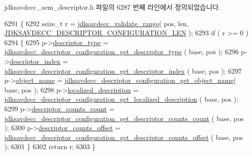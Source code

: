 jdksavdecc\+\_\+aem\+\_\+descriptor.\+h 파일의 6287 번째 라인에서 정의되었습니다.


\begin{DoxyCode}
6291 \{
6292     ssize\_t r = \hyperlink{group__util_ga9c02bdfe76c69163647c3196db7a73a1}{jdksavdecc\_validate\_range}( pos, len, 
      \hyperlink{group__descriptor__configuration_ga78260215d98013c8862d07707d8e1a85}{JDKSAVDECC\_DESCRIPTOR\_CONFIGURATION\_LEN} );
6293     \textcolor{keywordflow}{if} ( r >= 0 )
6294     \{
6295         p->\hyperlink{structjdksavdecc__descriptor__configuration_ab7c32b6c7131c13d4ea3b7ee2f09b78d}{descriptor\_type} = 
      \hyperlink{group__descriptor__configuration_ga6d8fc7c6f91ce938afbebc9681561e7f}{jdksavdecc\_descriptor\_configuration\_get\_descriptor\_type}
      ( base, pos );
6296         p->\hyperlink{structjdksavdecc__descriptor__configuration_a042bbc76d835b82d27c1932431ee38d4}{descriptor\_index} = 
      \hyperlink{group__descriptor__configuration_ga25a1868246dd5a8f9e0a6c0dd6e40526}{jdksavdecc\_descriptor\_configuration\_get\_descriptor\_index}
      ( base, pos );
6297         p->\hyperlink{structjdksavdecc__descriptor__configuration_a7d1f5945a13863b1762fc6db74fa8f80}{object\_name} = 
      \hyperlink{group__descriptor__configuration_gab176c933b7ba3d33bb57e1769e1df4c6}{jdksavdecc\_descriptor\_configuration\_get\_object\_name}( 
      base, pos );
6298         p->\hyperlink{structjdksavdecc__descriptor__configuration_a0926f846ca65a83ad5bb06b4aff8f408}{localized\_description} = 
      \hyperlink{group__descriptor__configuration_ga70dadf1368b9c22e913d1b9068a23984}{jdksavdecc\_descriptor\_configuration\_get\_localized\_description}
      ( base, pos );
6299         p->\hyperlink{structjdksavdecc__descriptor__configuration_aecc8a2d99e1f750676ee92f68ddd1fa6}{descriptor\_counts\_count} = 
      \hyperlink{group__descriptor__configuration_gad6922158e53499489216fe5842103f98}{jdksavdecc\_descriptor\_configuration\_get\_descriptor\_counts\_count}
      ( base, pos );
6300         p->\hyperlink{structjdksavdecc__descriptor__configuration_ae57b83bb9db0fb81735dba7d02bac8bb}{descriptor\_counts\_offset} = 
      \hyperlink{group__descriptor__configuration_gaa8e16a0d5ab45bd75106b222966faac7}{jdksavdecc\_descriptor\_configuration\_get\_descriptor\_counts\_offset}
      ( base, pos );
6301     \}
6302     \textcolor{keywordflow}{return} r;
6303 \}
\end{DoxyCode}


